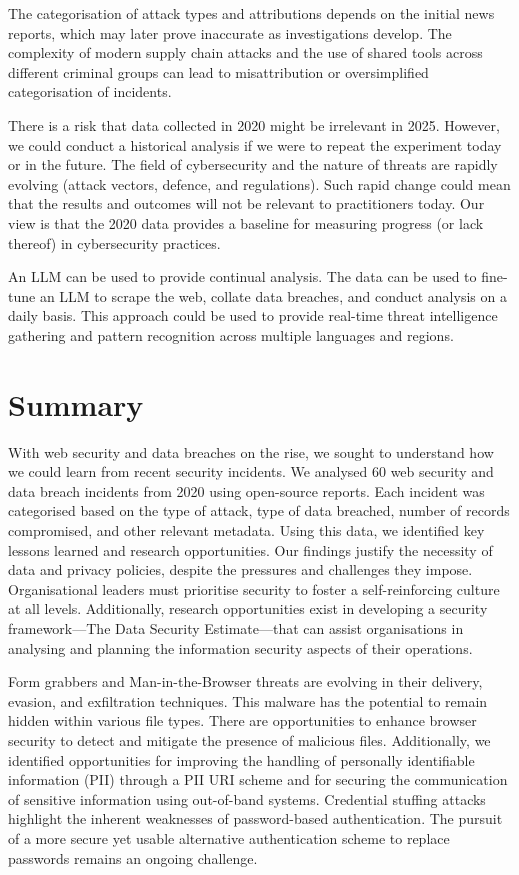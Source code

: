The categorisation of attack types and attributions depends on the initial news reports, which may later prove inaccurate as investigations develop. The complexity of modern supply chain attacks and the use of shared tools across different criminal groups can lead to misattribution or oversimplified categorisation of incidents.

There is a risk that data collected in 2020 might be irrelevant in 2025. However, we could conduct a historical analysis if we were to repeat the experiment today or in the future. The field of cybersecurity and the nature of threats are rapidly evolving (attack vectors, defence, and regulations). Such rapid change could mean that the results and outcomes will not be relevant to practitioners today. Our view is that the 2020 data provides a baseline for measuring progress (or lack thereof) in cybersecurity practices.

An LLM can be used to provide continual analysis. The data can be used to fine-tune an LLM to scrape the web, collate data breaches, and conduct analysis on a daily basis. This approach could be used to provide real-time threat intelligence gathering and pattern recognition across multiple languages and regions.

\section{Summary}
\label{sec::chp3::summary}

With web security and data breaches on the rise, we sought to understand how we could learn from recent security incidents. We analysed 60 web security and data breach incidents from 2020 using open-source reports. Each incident was categorised based on the type of attack, type of data breached, number of records compromised, and other relevant metadata. Using this data, we identified key lessons learned and research opportunities. Our findings justify the necessity of data and privacy policies, despite the pressures and challenges they impose. Organisational leaders must prioritise security to foster a self-reinforcing culture at all levels. Additionally, research opportunities exist in developing a security framework—The Data Security Estimate—that can assist organisations in analysing and planning the information security aspects of their operations.

Form grabbers and Man-in-the-Browser threats are evolving in their delivery, evasion, and exfiltration techniques. This malware has the potential to remain hidden within various file types. There are opportunities to enhance browser security to detect and mitigate the presence of malicious files. Additionally, we identified opportunities for improving the handling of personally identifiable information (PII) through a PII URI scheme and for securing the communication of sensitive information using out-of-band systems. Credential stuffing attacks highlight the inherent weaknesses of password-based authentication. The pursuit of a more secure yet usable alternative authentication scheme to replace passwords remains an ongoing challenge.